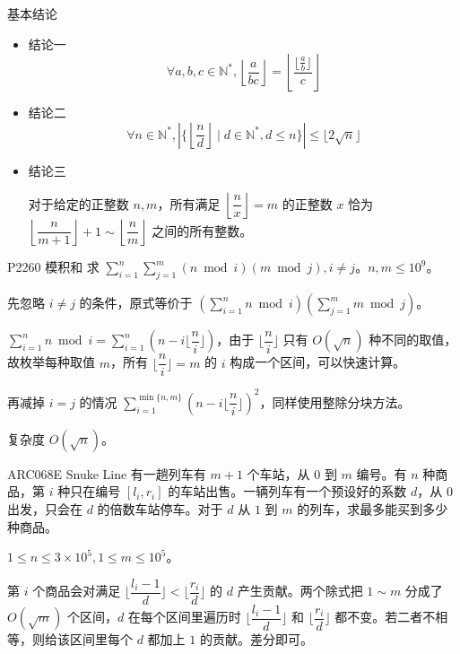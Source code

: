 \documentclass [hyperref={bookmarksdepth=4}, aspectratio=169] {beamer}
\theoremstyle {fy}
\def\N{\mathbb{N}}
\begin{document}
\begin{frame}{基本结论}
\begin{itemize}
    \item 结论一
  $$
  \forall a,b,c\in \N^{*},\left\lfloor\frac{a}{bc}\right\rfloor=\left\lfloor\frac{\lfloor\frac{a}{b}\rfloor}{c}\right\rfloor
  $$

    \item 结论二
  $$
  \forall n\in\N^{*},|\{\left\lfloor\frac{n}{d}\right\rfloor\mid d\in\N^{*},d\le n \}|\le\lfloor2\sqrt n\rfloor
  $$

    \item 结论三

  对于给定的正整数 $n,m$，所有满足 $\left\lfloor\dfrac{n}{x}\right\rfloor=m$ 的正整数 $x$ 恰为 $\left\lfloor\dfrac{n}{m+1}\right\rfloor+1\sim \left\lfloor\dfrac{n}{m}\right\rfloor$ 之间的所有整数。
\end{itemize}
\end{frame}

\begin{frame}{P2260 模积和}
求 $\sum\limits_{i=1}^n\sum\limits_{j=1}^m(n\bmod i)(m\bmod j),i\neq j$。$n,m\le 10^9$。

先忽略 $i\neq j$ 的条件，原式等价于 $(\sum\limits_{i=1}^n n\bmod i)(\sum\limits_{j=1}^mm\bmod j)$。

$\sum\limits_{i=1}^nn\bmod i=\sum\limits_{i=1}^n(n-i\lfloor\dfrac{n}{i}\rfloor)$，由于 $\lfloor\dfrac{n}{i}\rfloor$ 只有 $O(\sqrt n)$ 种不同的取值，故枚举每种取值 $m$，所有 $\lfloor\dfrac{n}{i}\rfloor=m$ 的 $i$ 构成一个区间，可以快速计算。

再减掉 $i=j$ 的情况 $\sum\limits_{i=1}^{\min\{n,m\}}(n-i\lfloor\dfrac{n}{i}\rfloor)^2$，同样使用整除分块方法。

复杂度 $O(\sqrt n)$。
\end{frame}

\begin{frame}{ARC068E Snuke Line}
有一趟列车有 $m+1$ 个车站，从 $0$ 到 $m$ 编号。有 $n$ 种商品，第 $i$ 种只在编号 $[l_i,r_i]$ 的车站出售。一辆列车有一个预设好的系数 $d$，从 $0$ 出发，只会在 $d$ 的倍数车站停车。对于 $d$ 从 $1$ 到 $m$ 的列车，求最多能买到多少种商品。

$1\le n\le 3\times10^5,1\le m\le 10^5$。

第 $i$ 个商品会对满足 $\lfloor\dfrac{l_i-1}{d}\rfloor<\lfloor\dfrac{r_i}{d}\rfloor$ 的 $d$ 产生贡献。两个除式把 $1\sim m$ 分成了 $O(\sqrt m)$ 个区间，$d$ 在每个区间里遍历时 $\lfloor\dfrac{l_i-1}{d}\rfloor$ 和 $\lfloor\dfrac{r_i}{d}\rfloor$ 都不变。若二者不相等，则给该区间里每个 $d$ 都加上 $1$ 的贡献。差分即可。
\end{frame}
\end{document}
